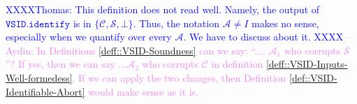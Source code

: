 
\textcolor{blue}{XXXXThomas: This definition does not read well. Namely, the output of $\mathtt{VSID.identify}$ is in $\{ \mathcal{C},\mathcal{S},\bot\}$. Thus, the notation $\mathcal{A}\neq I$ makes no sense, especially when we quantify over every $\mathcal{A}$. We have to discuss about it. XXXX}
\textcolor{violet}{--Aydin: In Definitions \ref{deff::VSID-Soundness} can we say: ``.... $\mathcal{A}_1$ who corrupts $\mathcal{S}$''? If yes, then we can say ...$\mathcal{A}_2$ who corrupts $\mathcal{C}$  in definition \ref{deff::VSID-Inputs-Well-formedess}. If we can apply the two changes, then Definition \ref{def::VSID-Identifiable-Abort} would make sense as it is.}





